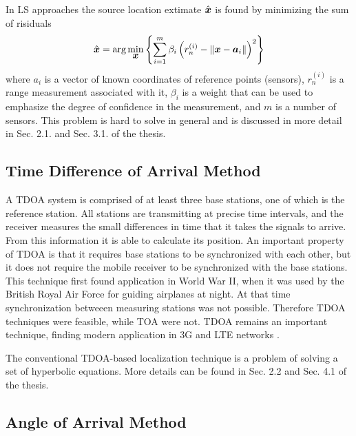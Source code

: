 In LS approaches the source location extimate $\hat{\mbox{\boldmath$x$}}$ is found by minimizing the sum of risiduals \cite{GeoLoc}
\begin{equation}
\nonumber
\hat{\mbox{\boldmath$x$}} = \mbox{arg}\min_{\mbox{\boldmath$x$}} \left\lbrace \sum_{i=1}^m \beta_i\left(r_n^{(i)} - \|\mbox{\boldmath$x$} - \mbox{\boldmath$a$}_i\|\right)^2 \right\rbrace
\end{equation}
where $a_i$ is a vector of known coordinates of reference points (sensors),   $r_n^{(i)}$ is a range measurement associated with it, $\beta_i$ is a weight
that can be used to emphasize  the degree of confidence in the measurement, and $m$ is a number of sensors. This problem is hard to solve in general and is discussed in more detail in Sec. 2.1. and Sec. 3.1. of the thesis.


\subsection{Time Difference of Arrival Method}

A TDOA system is comprised of at least three base stations, one of which is the reference station. All stations are transmitting at precise time intervals, and the receiver measures the small differences in time that it takes the signals to arrive. From this information it is able to calculate its position. 
An important property of TDOA is that it requires base stations to be synchronized with each other, but it does not require the mobile receiver to be synchronized with the base stations. This technique first found application
in World War II, when it was used by the British Royal Air Force for guiding airplanes at night. At that time synchronization betweeen measuring stations was not possible. Therefore TDOA techniques were feasible, while TOA were not. TDOA remains an important technique, finding modern application in 3G and LTE networks \cite{Ascom}.


The conventional TDOA-based localization technique is a problem of solving a set of hyperbolic equations. More details can be found in Sec. 2.2 and Sec. 4.1 of the thesis.

\subsection{Angle of Arrival Method}

